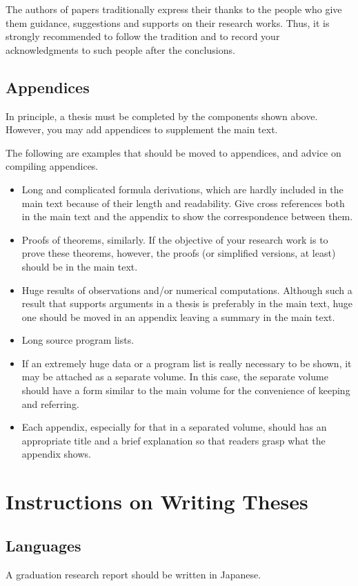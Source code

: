 The authors of papers traditionally express their thanks to the people who
give them guidance, suggestions and supports on their research works.  Thus,
it is strongly recommended to follow the tradition and to record your
acknowledgments to such people after the conclusions.

\subsection{Appendices}\label{subsec-appendix}
In principle, a thesis must be completed by the components shown above.
However, you may add appendices to supplement the main text.

The following are examples that should be moved to appendices, and advice
on compiling appendices.
\begin{itemize}%
\item
Long and complicated formula derivations, which are hardly included in the
main text because of their length and readability.  Give cross references
both in the main text and the appendix to show the correspondence between
them.
\item
Proofs of theorems, similarly.  If the objective of your research work is to
prove these theorems, however, the proofs (or simplified versions, at least)
should be in the main text.
\item
Huge results of observations and/or numerical computations.  Although such a
result that supports arguments in a thesis is preferably in the main text,
huge one should be moved in an appendix leaving a summary in the main text.
\item
Long source program lists.
\item
If an extremely huge data or a program list is really necessary to be shown,
it may be attached as a separate volume.  In this case, the separate volume
should have a form similar to the main volume for the convenience of keeping
and referring.
\item
Each appendix, especially for that in a separated volume, should has an
appropriate title and a brief explanation so that readers grasp what the
appendix shows.
\end{itemize}%

\section{Instructions on Writing Theses}\label{sec-instruction}
\subsection{Languages}\label{subsec-language}
A graduation research report should be written in {\EM Japanese}.

